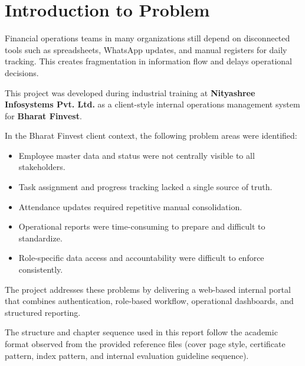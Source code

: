 \chapter{Introduction to Problem}

Financial operations teams in many organizations still depend on disconnected tools such as spreadsheets, WhatsApp updates, and manual registers for daily tracking. This creates fragmentation in information flow and delays operational decisions.

This project was developed during industrial training at \textbf{Nityashree Infosystems Pvt. Ltd.} as a client-style internal operations management system for \textbf{Bharat Finvest}.

In the Bharat Finvest client context, the following problem areas were identified:
\begin{itemize}[leftmargin=1.3cm]
\item Employee master data and status were not centrally visible to all stakeholders.
\item Task assignment and progress tracking lacked a single source of truth.
\item Attendance updates required repetitive manual consolidation.
\item Operational reports were time-consuming to prepare and difficult to standardize.
\item Role-specific data access and accountability were difficult to enforce consistently.
\end{itemize}

The project addresses these problems by delivering a web-based internal portal that combines authentication, role-based workflow, operational dashboards, and structured reporting.

The structure and chapter sequence used in this report follow the academic format observed from the provided reference files (cover page style, certificate pattern, index pattern, and internal evaluation guideline sequence).
